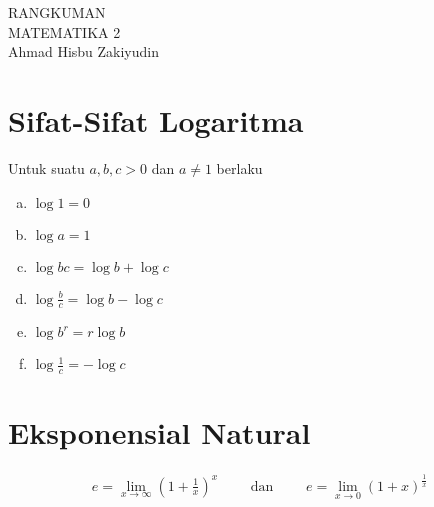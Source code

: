\documentclass{article}
\newcommand\mylog[1]{\mathop{{}^{#1}\mathrm{log}}}
\begin{document}
 \begin{titlepage}
    \vspace*{\fill}
    \begin{center}
      \Huge {RANGKUMAN \\ MATEMATIKA 2}\\[0.4 cm]
      \huge {Ahmad Hisbu Zakiyudin}
    \end{center}
    \vspace*{\fill}
  \end{titlepage}
\makeatletter
\renewcommand*\env@matrix[1][*\c@MaxMatrixCols c]{%
  \hskip -\arraycolsep
  \let\@ifnextchar\new@ifnextchar
  \array{#1}}
\makeatother
\newcount\arrowcount
\newcommand\arrows[1]{
        \global\arrowcount#1
        \ifnum\arrowcount>0
                \begin{matrix}[c]
                \expandafter\nextarrow
        \fi
}
 
\newcommand\nextarrow[1]{
        \global\advance\arrowcount-1
        \ifx\relax#1\relax\else \xrightarrow{#1}\fi
        \ifnum\arrowcount=0
                \end{matrix}
        \else
                \\
                \expandafter\nextarrow
        \fi
}
\newpage
{}
\section*{Sifat-Sifat Logaritma}
Untuk suatu $a,b,c>0$ dan $a\neq 1$ berlaku
\begin{multicols}{2}
\begin{enumerate}[a)]
	\item $\mylog{a} 1 = 0$
	\item $\mylog{a} a = 1$
	\item $\mylog{a} bc = \mylog{a} b + \mylog{a} c$
	\item $\mylog{a} \frac{b}{c} = \mylog{a} b - \mylog{a} c$
	\item $\mylog{a} b^r = r\mylog{a} b $
	\item $\mylog{a} \frac{1}{c} = -\mylog{a} c$
\end{enumerate}
\end{multicols}
\section*{Eksponensial Natural}
\begin{align*}
e=\lim_{x\rightarrow \infty} \left(1+\frac{1}{x}\right)^x \qquad\text{ dan } \qquad e = \lim_{x\rightarrow 0} (1+x)^{\frac{1}{x}}
\end{align*}
\end{document}
